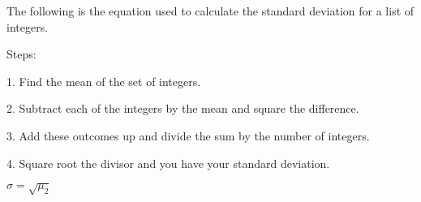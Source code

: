 \documentclass[a4paper,12pt]{article}
\begin{document}
\begin{description}
\item {The following is the equation used to calculate the standard deviation for a list of integers.}
\item {Steps:}
\item {1. Find the mean of the set of integers.}
\item {2. Subtract each of the integers by the mean and square the difference.}
\item {3. Add these outcomes up and divide the sum by the number of integers.}
\item {4. Square root the divisor and you have your standard deviation.}
\end{description}
$\sigma = \sqrt {\mu _2 }$
\end{document}
